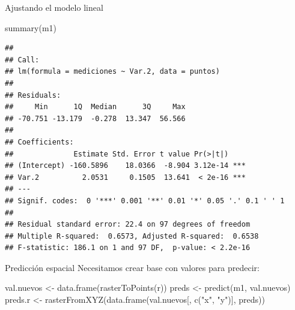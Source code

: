 \documentclass[
  11pt,
  ignorenonframetext,
]{beamer}
\newenvironment{Shaded}{}{}
\newcommand{\FunctionTok}[1]{\textcolor[rgb]{0.02,0.16,0.49}{#1}}
\newcommand{\NormalTok}[1]{#1}
\newcommand{\OtherTok}[1]{\textcolor[rgb]{0.00,0.44,0.13}{#1}}
\newcommand{\StringTok}[1]{\textcolor[rgb]{0.25,0.44,0.63}{#1}}
\begin{document}
\begin{frame}[fragile]{Ajustando el modelo lineal}
\protect\hypertarget{ajustando-el-modelo-lineal-1}{}
\begin{Shaded}
\begin{Highlighting}[]
\FunctionTok{summary}\NormalTok{(m1)}
\end{Highlighting}
\end{Shaded}

\begin{verbatim}
## 
## Call:
## lm(formula = mediciones ~ Var.2, data = puntos)
## 
## Residuals:
##     Min      1Q  Median      3Q     Max 
## -70.751 -13.179  -0.278  13.347  56.566 
## 
## Coefficients:
##              Estimate Std. Error t value Pr(>|t|)    
## (Intercept) -160.5896    18.0366  -8.904 3.12e-14 ***
## Var.2          2.0531     0.1505  13.641  < 2e-16 ***
## ---
## Signif. codes:  0 '***' 0.001 '**' 0.01 '*' 0.05 '.' 0.1 ' ' 1
## 
## Residual standard error: 22.4 on 97 degrees of freedom
## Multiple R-squared:  0.6573, Adjusted R-squared:  0.6538 
## F-statistic: 186.1 on 1 and 97 DF,  p-value: < 2.2e-16
\end{verbatim}
\end{frame}

\begin{frame}[fragile]{Predicción espacial}
\protect\hypertarget{predicciuxf3n-espacial}{}
Necesitamos crear base con valores para predecir:

\begin{Shaded}
\begin{Highlighting}[]
\NormalTok{val.nuevos }\OtherTok{\textless{}{-}} \FunctionTok{data.frame}\NormalTok{(}\FunctionTok{rasterToPoints}\NormalTok{(r))}
\NormalTok{preds }\OtherTok{\textless{}{-}} \FunctionTok{predict}\NormalTok{(m1, val.nuevos)}
\NormalTok{preds.r }\OtherTok{\textless{}{-}} \FunctionTok{rasterFromXYZ}\NormalTok{(}\FunctionTok{data.frame}\NormalTok{(val.nuevos[, }\FunctionTok{c}\NormalTok{(}\StringTok{"x"}\NormalTok{, }\StringTok{"y"}\NormalTok{)], preds))}
\end{Highlighting}
\end{Shaded}
\end{frame}
\end{document}
